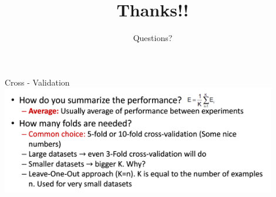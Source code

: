 \documentclass[aspectratio=169,14pt,usenames,dvipsnames]{beamer}
\begin{document}
\begin{frame}[t]{Cross - Validation}
\centering
\includegraphics[width=0.9\textwidth, height=0.7\textheight]{Images/AIML_MLPrinciples_IMG12.png}
\end{frame}


{\1   
\begin{frame}
\title{Thanks!!}
	\subtitle{Questions?}
	\titlepage
\end{frame}
}
\end{document}
